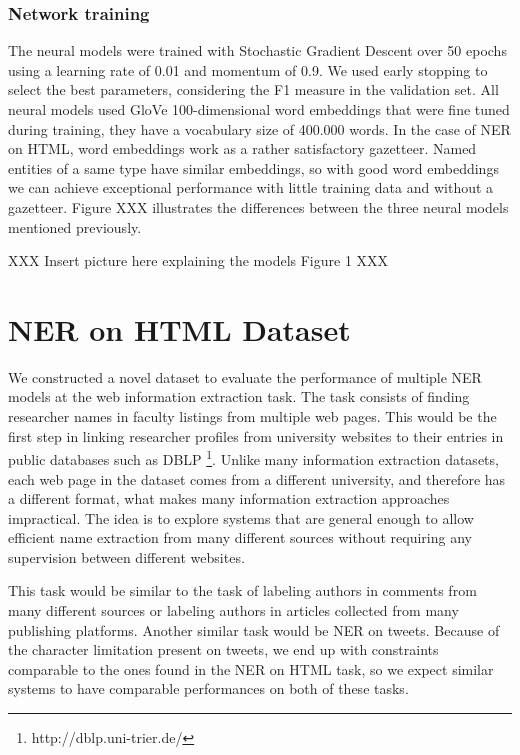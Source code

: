 \documentclass[sigconf]{acmart}
\begin{document}
\subsubsection{Network training}

The neural models were trained with Stochastic Gradient Descent over 50 epochs using a learning 
rate of 0.01 and momentum of 0.9. We used early stopping \cite{Caruana2000} to select the best 
parameters,  considering the F1 measure in the validation set. All neural models used 
GloVe 100-dimensional word embeddings \cite{Pennington2014} that were fine tuned during training,
they have a vocabulary size of 400.000 words.
In the case of NER on HTML, word embeddings work as a rather satisfactory gazetteer. Named entities 
of a same type have similar embeddings, so with good word embeddings we can achieve exceptional 
performance with little training data and without a gazetteer. Figure XXX illustrates the differences
between the three neural models mentioned previously.

XXX Insert picture here explaining the models Figure 1 XXX

\section{NER on HTML Dataset}

We constructed a novel dataset to evaluate the performance of multiple NER models
at the web information extraction task. The task consists of finding researcher
names in faculty listings from multiple web pages. This would be the 
first step in linking researcher profiles from university websites to their entries
in public databases such as DBLP \footnote{http://dblp.uni-trier.de/}. Unlike many
information extraction datasets, each web page in the dataset comes from a different 
university, and therefore has a different format, what makes many information
extraction approaches impractical. The idea is to explore systems that are general 
enough to allow efficient name extraction from many different sources without requiring
any supervision between different websites. 

This task would be similar to the task of labeling authors in comments
from many different sources or labeling authors in articles collected from many
publishing platforms. Another similar task would be NER on tweets. Because of the character
limitation present on tweets, we end up with constraints comparable to the ones 
found in the NER on HTML task, so we expect similar systems to have comparable performances
on both of these tasks. 
\end{document}
